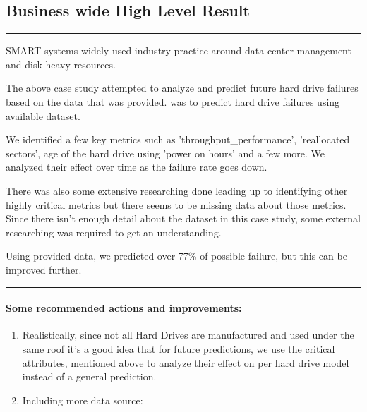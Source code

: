 \documentclass[11pt]{article}
\providecommand{\tightlist}{%
      \setlength{\itemsep}{0pt}\setlength{\parskip}{0pt}}
\begin{document}
    \subsection{Business wide High Level
Result}\label{business-wide-high-level-result}

\begin{center}\rule{0.5\linewidth}{\linethickness}\end{center}

SMART systems widely used industry practice around data center
management and disk heavy resources.

The above case study attempted to analyze and predict future hard drive
failures based on the data that was provided. was to predict hard drive
failures using available dataset.

We identified a few key metrics such as 'throughput\_performance',
'reallocated sectors', age of the hard drive using 'power on hours' and
a few more. We analyzed their effect over time as the failure rate goes
down.

There was also some extensive researching done leading up to identifying
other highly critical metrics but there seems to be missing data about
those metrics. Since there isn't enough detail about the dataset in this
case study, some external researching was required to get an
understanding.

Using provided data, we predicted over 77\% of possible failure, but
this can be improved further.

\begin{center}\rule{0.5\linewidth}{\linethickness}\end{center}

\paragraph{Some recommended actions and
improvements:}\label{some-recommended-actions-and-improvements}

\begin{enumerate}
\def\labelenumi{\arabic{enumi}.}
\tightlist
\item
  Realistically, since not all Hard Drives are manufactured and used
  under the same roof it's a good idea that for future predictions, we
  use the critical attributes, mentioned above to analyze their effect
  on per hard drive model instead of a general prediction.
\item
  Including more data source:
\end{enumerate}
\end{document}
